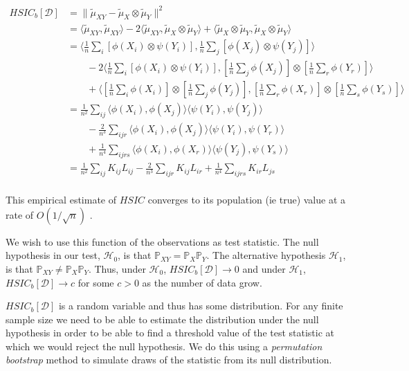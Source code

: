 \documentclass[12pt]{article}
\numberwithin{claim}{section}
\numberwithin{lemma}{section}
\numberwithin{theorem}{section}
\begin{document}
\begin{align*}
HSIC_b[\mathcal{D}] &= \|\tilde{\mu}_{XY} - \tilde{\mu}_X\otimes \tilde{\mu}_Y\|^2 \\
& = \langle \tilde{\mu}_{XY} , \tilde{\mu}_{XY} \rangle - 2\langle \tilde{\mu}_{XY} , \tilde{\mu}_X\otimes \tilde{\mu}_Y\rangle + \langle\tilde{\mu}_X\otimes \tilde{\mu}_Y ,\tilde{\mu}_X\otimes \tilde{\mu}_Y \rangle \\
& = \langle\frac{1}{n}\sum_i[\phi(X_i)\otimes\psi(Y_i)] ,\frac{1}{n}\sum_j[\phi(X_j)\otimes\psi(Y_j)] \rangle \\
& \quad \quad - 2\langle\frac{1}{n}\sum_i[\phi(X_i)\otimes\psi(Y_i)] , [\frac{1}{n}\sum_j\phi(X_j)]\otimes[\frac{1}{n}\sum_r\phi(Y_r)]\rangle  \\
& \quad \quad + \langle [\frac{1}{n}\sum_i\phi(X_i)]\otimes[\frac{1}{n}\sum_j\phi(Y_j)] ,[\frac{1}{n}\sum_r\phi(X_r)]\otimes[\frac{1}{n}\sum_s\phi(Y_s)] \rangle \\
&=\frac{1}{n^2}\sum_{ij}\langle\phi(X_i),\phi(X_j)\rangle\langle\psi(Y_i),\psi(Y_j)\rangle \\
& \quad \quad - \frac{2}{n^3}\sum_{ijr}\langle\phi(X_i),\phi(X_j)\rangle\langle\psi(Y_i),\psi(Y_r)\rangle \\
&\quad \quad+ \frac{1}{n^4}\sum_{ijrs}\langle\phi(X_i),\phi(X_r)\rangle\langle\psi(Y_j),\psi(Y_s)\rangle\\
&=\frac{1}{n^2}\sum_{ij}K_{ij}L_{ij} - \frac{2}{n^3}\sum_{ijr}K_{ij}L_{ir} + \frac{1}{n^4}\sum_{ijrs}K_{ir}L_{js}\\
\end{align*}

This empirical estimate of $HSIC$ converges to its population (ie true) value at a rate of $O(1/\sqrt{n})$ \cite{gretton2005kernel}\cite{gretton2005measuring}.

We wish to use this function of the observations as test statistic. The null hypothesis in our test, $\mathcal{H}_0$, is that $\mathbb{P}_{XY} = \mathbb{P}_{X}\mathbb{P}_{Y}$. The alternative hypothesis $\mathcal{H}_1$, is that $\mathbb{P}_{XY} \neq \mathbb{P}_{X}\mathbb{P}_{Y}$. Thus, under $\mathcal{H}_0$, $HSIC_b[\mathcal{D}] \longrightarrow 0$ and under $\mathcal{H}_1$, $HSIC_b[\mathcal{D}] \longrightarrow c$ for some $c > 0$ as the number of data grow.

$HSIC_b[\mathcal{D}]$ is a random variable and thus has some distribution. For any finite sample size we need to be able to estimate the distribution under the null hypothesis in order to be able to find a threshold value of the test statistic at which we would reject the null hypothesis. We do this using a \emph{permutation bootstrap} method to simulate draws of the statistic from its null distribution.
\end{document}
